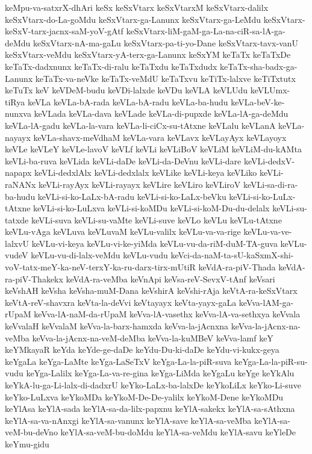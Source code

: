 {keMpu-va-satxrX-dhAri
keSx
keSxVtarx
keSxVtarxM
keSxVtarx-dalilx
keSxVtarx-do-La-goMdu
keSxVtarx-ga-Lanunx
keSxVtarx-ga-LeMdu
keSxVtarx-keSxV-tarx-jacnx-saM-yoV-gAtf
keSxVtarx-liM-gaM-ga-La-na-ciR-sa-lA-ga-deMdu
keSxVtarx-nA-ma-gaLu
keSxVtarx-pa-ti-yo-Dane
keSxVtarx-tavx-vanU
keSxVtarx-veMdu
keSxVtarx-yA-terx-ga-Lanunx
keSxYM
keTaTx
keTaTxDe
keTaTx-dadxnunx
keTaTx-di-ralu
keTaTxdu
keTaTxdudx
keTaTx-sha-badx-ga-Lanunx
keTaTx-va-neVke
keTaTx-veMdU
keTaTxvu
keTiTx-lalxve
keTiTxtutx
keTuTx
keV
keVDeM-budu
keVDi-lalxde
keVDu
keVLA
keVLUdu
keVLUmx-tiRya
keVLa
keVLa-bA-rada
keVLa-bA-radu
keVLa-ba-hudu
keVLa-beV-ke-nunxva
keVLada
keVLa-dava
keVLade
keVLa-di-pupxde
keVLa-lA-ga-deMdu
keVLa-lA-gadu
keVLa-la-vara
keVLa-li-ciCx-su-tAtxne
keVLalu
keVLanA
keVLa-nayayx
keVLa-shavx-meVdhaM
keVLa-vara
keVLavx
keVLayAyx
keVLayoyx
keVLe
keVLeY
keVLe-lavoV
keVLf
keVLi
keVLiBoV
keVLiM
keVLiM-du-kAMta
keVLi-ba-ruva
keVLida
keVLi-daDe
keVLi-da-DeVnu
keVLi-dare
keVLi-dedxV-napapx
keVLi-dedxlAlx
keVLi-dedxlalx
keVLike
keVLi-keya
keVLiko
keVLi-raNANx
keVLi-rayAyx
keVLi-rayayx
keVLire
keVLiro
keVLiroV
keVLi-sa-di-ra-ba-hudu
keVLi-si-ko-LaLx-bA-radu
keVLi-si-ko-LaLx-beVku
keVLi-si-ko-LuLx-tAtxne
keVLi-si-ko-LuLxva
keVLi-si-koMDu
keVLi-si-koM-Du-du-delalx
keVLi-su-tatxde
keVLi-suva
keVLi-su-vaMte
keVLi-suve
keVLo
keVLu
keVLu-tAtxne
keVLu-vAga
keVLuva
keVLuvaM
keVLu-valilx
keVLu-va-va-rige
keVLu-va-ve-lalxvU
keVLu-vi-keya
keVLu-vi-ke-yiMda
keVLu-vu-da-riM-duM-TA-guva
keVLu-vudeV
keVLu-vu-di-lalx-veMdu
keVLu-vudu
keVci-da-naM-ta-sU-kaSxmX-shi-voV-tatx-meY-ka-neV-terxY-ka-ru-darx-tirx-mUtiR
keVdA-ra-piV-Thada
keVdA-ra-piV-Thakekx
keVdA-ra-veMba
keVnApi
keVsa-reV-SevxV-tAnf
keVsari
keVshAH
keVsha
keVsha-muM-Dana
keVshirA
keVshi-rAja
keVtA-ra-keSxVtarx
keVtA-reV-shavxra
keVta-la-deVvi
keVtayayx
keVta-yayx-gaLa
keVva-lAM-ga-rUpaM
keVva-lA-naM-da-rUpaM
keVva-lA-vasethx
keVva-lA-va-sethxya
keVvala
keVvalaH
keVvalaM
keVva-la-barx-hamxda
keVva-la-jAcnxna
keVva-la-jAcnx-na-veMba
keVva-la-jAcnx-na-veM-deMba
keVva-la-kuMBeV
keVva-lamf
keY
keYMkayaR
keYda
keYde-ge-daDe
keYdu-Du-ki-daDe
keYdu-vi-kukx-geya
keYgaLa
keYga-LaMte
keYga-LaSeTxV
keYga-La-la-piR-suva
keYga-La-la-piR-su-vudu
keYga-Lalilx
keYga-La-va-re-gina
keYga-LiMda
keYgaLu
keYge
keYkAlu
keYkA-lu-ga-Li-lalx-di-dadxrU
keYko-LaLx-ba-lalxDe
keYkoLiLx
keYko-Li-suve
keYko-LuLxva
keYkoMDa
keYkoM-De-De-yalilx
keYkoM-Dene
keYkoMDu
keYlAsa
keYlA-sada
keYlA-sa-da-lilx-papxnu
keYlA-sakekx
keYlA-sa-sAthxna
keYlA-sa-va-nAnxgi
keYlA-sa-vanunx
keYlA-save
keYlA-sa-veMba
keYlA-sa-veM-bu-deVno
keYlA-sa-veM-bu-doMdu
keYlA-sa-veMdu
keYlA-savu
keYleDe
keYmu-gidu
}
